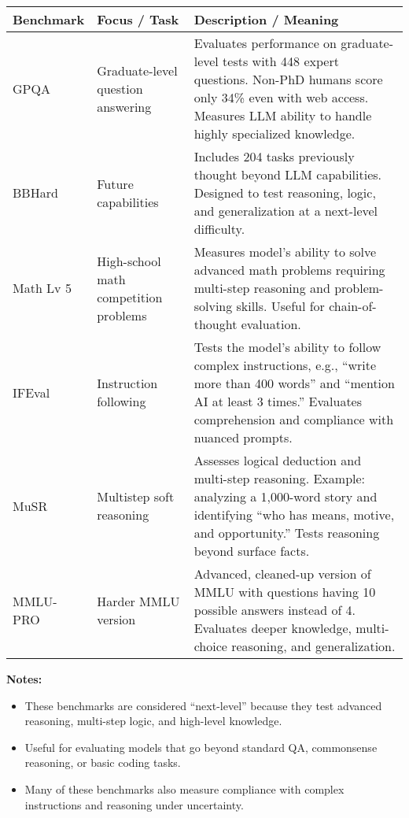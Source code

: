 \documentclass[a4paper, 12pt]{article}
\begin{document}
\begin{tabularx}{\textwidth}{|>{\hsize=0.2\hsize}X|>{\hsize=0.3\hsize}X|>{\hsize=0.5\hsize}X|}
\hline
\textbf{Benchmark} & \textbf{Focus / Task} & \textbf{Description / Meaning} \\
\hline
GPQA & Graduate-level question answering & Evaluates performance on graduate-level tests with 448 expert questions. Non-PhD humans score only 34\% even with web access. Measures LLM ability to handle highly specialized knowledge. \\
\hline
BBHard & Future capabilities & Includes 204 tasks previously thought beyond LLM capabilities. Designed to test reasoning, logic, and generalization at a next-level difficulty. \\
\hline
Math Lv 5 & High-school math competition problems & Measures model’s ability to solve advanced math problems requiring multi-step reasoning and problem-solving skills. Useful for chain-of-thought evaluation. \\
\hline
IFEval & Instruction following & Tests the model’s ability to follow complex instructions, e.g., “write more than 400 words” and “mention AI at least 3 times.” Evaluates comprehension and compliance with nuanced prompts. \\
\hline
MuSR & Multistep soft reasoning & Assesses logical deduction and multi-step reasoning. Example: analyzing a 1,000-word story and identifying “who has means, motive, and opportunity.” Tests reasoning beyond surface facts. \\
\hline
MMLU-PRO & Harder MMLU version & Advanced, cleaned-up version of MMLU with questions having 10 possible answers instead of 4. Evaluates deeper knowledge, multi-choice reasoning, and generalization. \\
\hline
\end{tabularx}

\vspace{1em}
\textbf{Notes:}
\begin{itemize}
    \item These benchmarks are considered “next-level” because they test advanced reasoning, multi-step logic, and high-level knowledge.  
    \item Useful for evaluating models that go beyond standard QA, commonsense reasoning, or basic coding tasks.  
    \item Many of these benchmarks also measure compliance with complex instructions and reasoning under uncertainty. 
\end{itemize}
\end{document}
